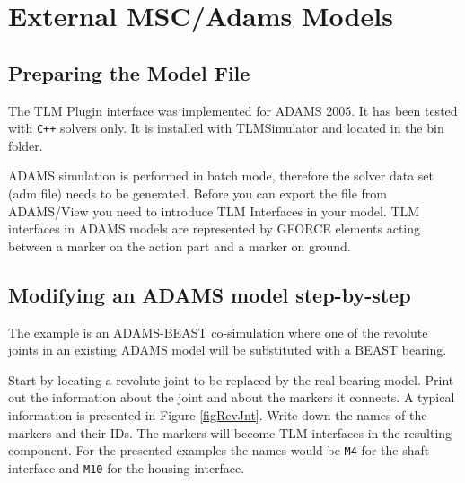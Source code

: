 \chapter{External MSC/Adams Models}
\label{MMADAMS}

\section{Preparing the Model File}
\label{secPrepareADAMS}
The TLM Plugin interface was implemented for ADAMS 2005. 
It has been tested with \verb!C++! solvers only. 
It is installed with TLMSimulator and located in the bin folder.

ADAMS simulation is performed in batch mode, therefore the solver data set (adm file) needs to be generated.
Before you can export the file from ADAMS/View you need to introduce TLM Interfaces in your model. 
TLM interfaces in ADAMS models are represented by GFORCE elements acting between a marker on the action part and a marker on ground. 

\section{Modifying an ADAMS model step-by-step}
\label{secADAMSsteps}
The example is an ADAMS-BEAST co-simulation where one of the revolute joints in an existing ADAMS model will be substituted with a BEAST bearing.

Start by locating a revolute joint to be replaced by the real bearing model. 
Print out the information about the joint and about the markers it connects.
A typical information is presented in Figure \ref{figRevJnt}.
Write down the names of the markers and their IDs. 
The markers will become TLM interfaces in the resulting component. 
For the presented examples the names would be {\tt M4} for the shaft interface and {\tt M10} for the housing interface.

